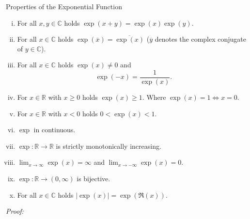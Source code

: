 \begin{Theorem}{Properties of the Exponential Function}\label{thm:expprop}
 \begin{enumerate}[(i)]
  \item For all $x,y\in\mathbb{C}$ holds $\exp(x+y)=\exp(x)\exp(y)$.
  \item For all $x\in\mathbb{C}$ holds $\exp(\overline{x})=\overline{\exp(x)}$ ($\overline{y}$ denotes the complex conjugate of $y\in\mathbb{C}$).
  \item For all $x\in\mathbb{C}$ holds $\exp(x)\neq0$ and
\[\exp(-x)=\frac1{\exp(x)}.\]
  \item For $x\in\mathbb{R}$ with $x\geq0$ holds $\exp(x)\geq1$. Where $\exp(x)=1 \Leftrightarrow x=0$.
  \item For $x\in\mathbb{R}$ with $x<0$ holds $0<\exp(x)<1$.
  \item $\exp$ in continuous.
  \item $\exp:\mathbb{R}\to\mathbb{R}$ is strictly monotonically increasing.
  \item $\lim_{x\to\infty}\exp(x)=\infty$ and $\lim_{x\to-\infty}\exp(x)=0$.
  \item $\exp:\mathbb{R}\to(0,\infty)$ is bijective.
  \item For all $x\in\mathbb{C}$ holds $|\exp(x)|=\exp(\Re(x))$.
 \end{enumerate}
\end{Theorem}
{\em Proof:}
